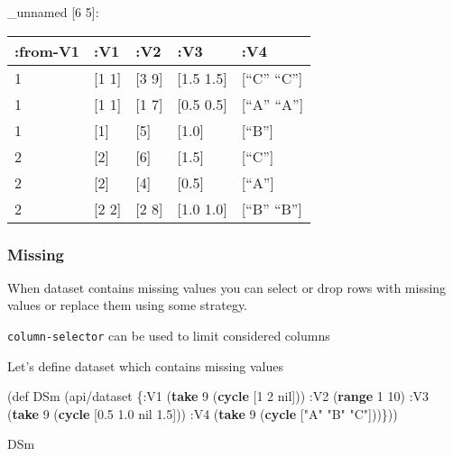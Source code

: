 \documentclass[]{article}
\newenvironment{Shaded}{\begin{snugshade}}{\end{snugshade}}
\newcommand{\AttributeTok}[1]{\textcolor[rgb]{0.77,0.63,0.00}{#1}}
\newcommand{\BuiltInTok}[1]{#1}
\newcommand{\DecValTok}[1]{\textcolor[rgb]{0.00,0.00,0.81}{#1}}
\newcommand{\FloatTok}[1]{\textcolor[rgb]{0.00,0.00,0.81}{#1}}
\newcommand{\FunctionTok}[1]{\textcolor[rgb]{0.00,0.00,0.00}{#1}}
\newcommand{\KeywordTok}[1]{\textcolor[rgb]{0.13,0.29,0.53}{\textbf{#1}}}
\newcommand{\NormalTok}[1]{#1}
\newcommand{\StringTok}[1]{\textcolor[rgb]{0.31,0.60,0.02}{#1}}
\newcommand{\VariableTok}[1]{\textcolor[rgb]{0.00,0.00,0.00}{#1}}
\begin{document}
\_unnamed {[}6 5{]}:

\begin{longtable}[]{@{}lllll@{}}
\toprule
:from-V1 & :V1 & :V2 & :V3 & :V4\tabularnewline
\midrule
\endhead
1 & {[}1 1{]} & {[}3 9{]} & {[}1.5 1.5{]} & {[}``C''
``C''{]}\tabularnewline
1 & {[}1 1{]} & {[}1 7{]} & {[}0.5 0.5{]} & {[}``A''
``A''{]}\tabularnewline
1 & {[}1{]} & {[}5{]} & {[}1.0{]} & {[}``B''{]}\tabularnewline
2 & {[}2{]} & {[}6{]} & {[}1.5{]} & {[}``C''{]}\tabularnewline
2 & {[}2{]} & {[}4{]} & {[}0.5{]} & {[}``A''{]}\tabularnewline
2 & {[}2 2{]} & {[}2 8{]} & {[}1.0 1.0{]} & {[}``B''
``B''{]}\tabularnewline
\bottomrule
\end{longtable}

\hypertarget{missing}{%
\subsubsection{Missing}\label{missing}}

When dataset contains missing values you can select or drop rows with
missing values or replace them using some strategy.

\texttt{column-selector} can be used to limit considered columns

Let's define dataset which contains missing values

\begin{Shaded}
\begin{Highlighting}[]
\NormalTok{(}\BuiltInTok{def}\FunctionTok{ DSm }\NormalTok{(api/dataset \{}\AttributeTok{:V1}\NormalTok{ (}\KeywordTok{take} \DecValTok{9}\NormalTok{ (}\KeywordTok{cycle}\NormalTok{ [}\DecValTok{1} \DecValTok{2} \VariableTok{nil}\NormalTok{]))}
                       \AttributeTok{:V2}\NormalTok{ (}\KeywordTok{range} \DecValTok{1} \DecValTok{10}\NormalTok{)}
                       \AttributeTok{:V3}\NormalTok{ (}\KeywordTok{take} \DecValTok{9}\NormalTok{ (}\KeywordTok{cycle}\NormalTok{ [}\FloatTok{0.5} \FloatTok{1.0} \VariableTok{nil} \FloatTok{1.5}\NormalTok{]))}
                       \AttributeTok{:V4}\NormalTok{ (}\KeywordTok{take} \DecValTok{9}\NormalTok{ (}\KeywordTok{cycle}\NormalTok{ [}\StringTok{"A"} \StringTok{"B"} \StringTok{"C"}\NormalTok{]))\}))}
\end{Highlighting}
\end{Shaded}

\begin{Shaded}
\begin{Highlighting}[]
\NormalTok{DSm}
\end{Highlighting}
\end{Shaded}
\end{document}
